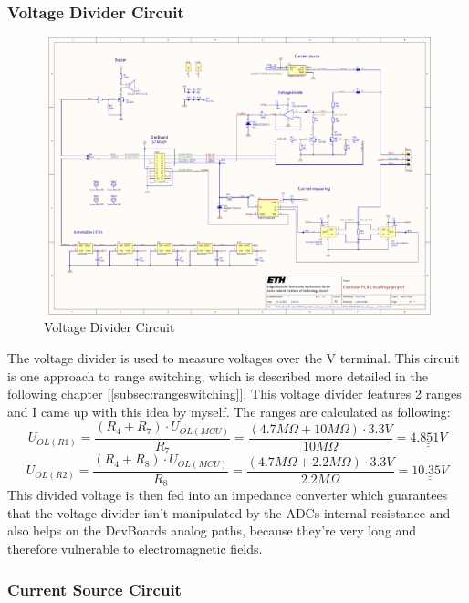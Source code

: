 \subsubsection{Voltage Divider Circuit}

\begin{figure}[H]
	\centering
	\includegraphics[width=12cm, trim={23cm 15cm 6cm 5cm}, clip]{../../../5_Hardware/PCB_EXTENSION_CircuitVoyager_pre1/Project Outputs for PCB_EXT_CV_PRE1/Schematic_PCB_EXTENSION_CircuitVoyager_pre1.pdf}
	\caption{Voltage Divider Circuit}
	\label{fig:Voltage Divider Circuit}
\end{figure}

The voltage divider is used to measure voltages over the V terminal. This circuit is one approach to range switching, which is described more detailed in the following chapter [\ref{subsec:rangeswitching}]. This voltage divider features 2 ranges and I came up with this idea by myself. The ranges are calculated as following:
\[U_{OL(R1)} = \frac{(R_4 + R_7) \cdot U_{OL(MCU)}}{R_7} = \frac{(4.7M\Omega + 10M\Omega) \cdot 3.3V}{10M\Omega} = \underline{\underline{4.851V}}\]
\[U_{OL(R2)} = \frac{(R_4 + R_8) \cdot U_{OL(MCU)}}{R_8} = \frac{(4.7M\Omega + 2.2M\Omega) \cdot 3.3V}{2.2M\Omega} = \underline{\underline{10.35V}}\]
This divided voltage is then fed into an impedance converter which guarantees that the voltage divider isn't manipulated by the ADCs internal resistance and also helps on the DevBoards analog paths, because they're very long and therefore vulnerable to electromagnetic fields.



\subsubsection{Current Source Circuit}

